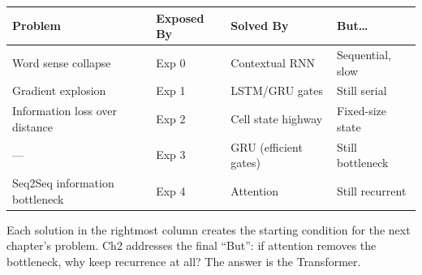 \begin{center}
\begin{tabular}{llll}
\toprule
\textbf{Problem} & \textbf{Exposed By} & \textbf{Solved By} & \textbf{But\ldots} \\
\midrule
Word sense collapse & Exp 0 & Contextual RNN & Sequential, slow \\
Gradient explosion & Exp 1 & LSTM/GRU gates & Still serial \\
Information loss over distance & Exp 2 & Cell state highway & Fixed-size state \\
--- & Exp 3 & GRU (efficient gates) & Still bottleneck \\
Seq2Seq information bottleneck & Exp 4 & Attention & Still recurrent \\
\bottomrule
\end{tabular}
\end{center}

Each solution in the rightmost column creates the starting condition for the next chapter's problem. Ch2 addresses the final ``But'': if attention removes the bottleneck, why keep recurrence at all? The answer is the Transformer.
